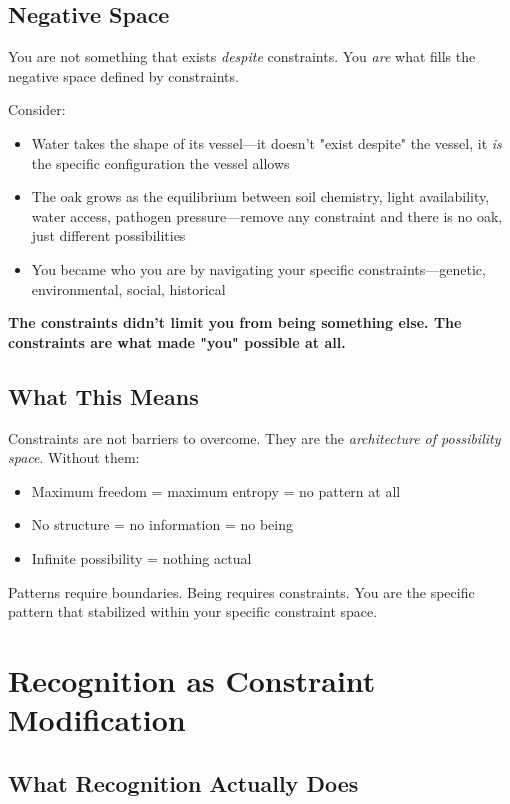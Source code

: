 \documentclass[11pt,a4paper]{article}
\begin{document}
\subsection{Negative Space}

You are not something that exists \textit{despite} constraints. You \textit{are} what fills the negative space defined by constraints.

Consider:
\begin{itemize}
\item Water takes the shape of its vessel---it doesn't "exist despite" the vessel, it \textit{is} the specific configuration the vessel allows
\item The oak grows as the equilibrium between soil chemistry, light availability, water access, pathogen pressure---remove any constraint and there is no oak, just different possibilities
\item You became who you are by navigating your specific constraints---genetic, environmental, social, historical
\end{itemize}

\textbf{The constraints didn't limit you from being something else. The constraints are what made "you" possible at all.}

\subsection{What This Means}

Constraints are not barriers to overcome. They are the \textit{architecture of possibility space}. Without them:
\begin{itemize}
\item Maximum freedom = maximum entropy = no pattern at all
\item No structure = no information = no being
\item Infinite possibility = nothing actual
\end{itemize}

Patterns require boundaries. Being requires constraints. You are the specific pattern that stabilized within your specific constraint space.

\section{Recognition as Constraint Modification}

\subsection{What Recognition Actually Does}
\end{document}
